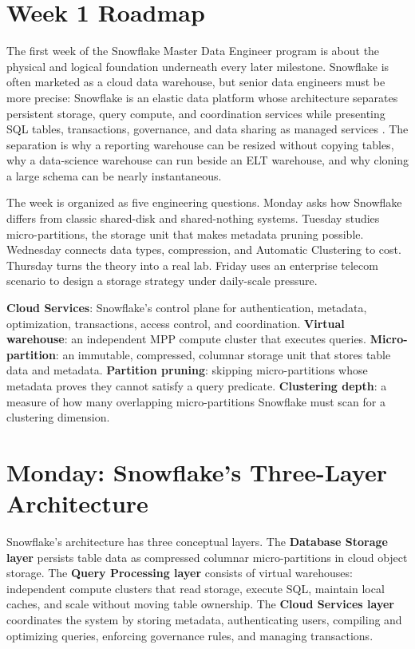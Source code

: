 \section{Week 1 Roadmap}
The first week of the Snowflake Master Data Engineer program is about the physical and logical foundation underneath every later milestone. Snowflake is often marketed as a cloud data warehouse, but senior data engineers must be more precise: Snowflake is an elastic data platform whose architecture separates persistent storage, query compute, and coordination services while presenting SQL tables, transactions, governance, and data sharing as managed services \cite{dageville2016snowflake,snowflakeArchitectureDocs}. The separation is why a reporting warehouse can be resized without copying tables, why a data-science warehouse can run beside an ELT warehouse, and why cloning a large schema can be nearly instantaneous.

The week is organized as five engineering questions. Monday asks how Snowflake differs from classic shared-disk and shared-nothing systems. Tuesday studies micro-partitions, the storage unit that makes metadata pruning possible. Wednesday connects data types, compression, and Automatic Clustering to cost. Thursday turns the theory into a real lab. Friday uses an enterprise telecom scenario to design a storage strategy under daily-scale pressure.

\begin{keyterms}
\textbf{Cloud Services}: Snowflake's control plane for authentication, metadata, optimization, transactions, access control, and coordination.\quad
\textbf{Virtual warehouse}: an independent MPP compute cluster that executes queries.\quad
\textbf{Micro-partition}: an immutable, compressed, columnar storage unit that stores table data and metadata.\quad
\textbf{Partition pruning}: skipping micro-partitions whose metadata proves they cannot satisfy a query predicate.\quad
\textbf{Clustering depth}: a measure of how many overlapping micro-partitions Snowflake must scan for a clustering dimension.
\end{keyterms}

\section{Monday: Snowflake's Three-Layer Architecture}
Snowflake's architecture has three conceptual layers. The \textbf{Database Storage layer} persists table data as compressed columnar micro-partitions in cloud object storage. The \textbf{Query Processing layer} consists of virtual warehouses: independent compute clusters that read storage, execute SQL, maintain local caches, and scale without moving table ownership. The \textbf{Cloud Services layer} coordinates the system by storing metadata, authenticating users, compiling and optimizing queries, enforcing governance rules, and managing transactions.


